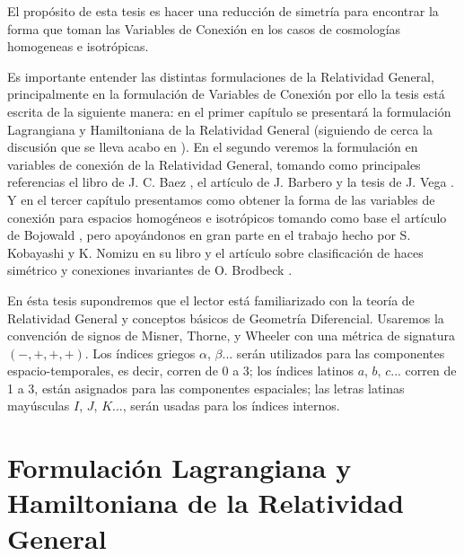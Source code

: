 \documentclass[11pt, letterpaper, spanish]{book}
\theoremstyle{definition}
\theoremstyle{plain}
\theoremstyle{remark}
\theoremstyle{break}
\begin{document}
El prop\'{o}sito de esta tesis es hacer una reducci\'{o}n de simetr\'{i}a para encontrar la forma que toman las Variables de Conexi\'{o}n en los casos de cosmolog\'{i}as homogeneas e isotr\'{o}picas.

Es importante entender las distintas formulaciones de la Relatividad General, principalmente en la formulaci\'{o}n de Variables de Conexi\'{o}n por ello la tesis est\'{a} escrita de la siguiente manera: en el primer cap\'{i}tulo se presentar\'{a} la formulaci\'{o}n Lagrangiana y Hamiltoniana de la Relatividad General (siguiendo de cerca la discusi\'{o}n que se lleva acabo en \cite{Poisson}). En el segundo veremos la formulaci\'{o}n en variables de conexi\'{o}n de la Relatividad General, tomando como principales referencias el libro de J. C. Baez \cite{Baez}, el art\'{i}culo de J. Barbero \cite{Barbero} y la tesis de J. Vega \cite{Vega}. Y en el tercer cap\'{i}tulo presentamos como obtener la forma de las variables de conexi\'{o}n para espacios homog\'{e}neos e isotr\'{o}picos tomando como base el art\'{i}culo de Bojowald \cite{Bojowald2005}, pero apoy\'{a}ndonos en gran parte en el trabajo hecho por S. Kobayashi y K. Nomizu en su libro \cite{Kobayashi} y el art\'{i}culo sobre clasificaci\'{o}n de haces sim\'{e}trico y conexiones invariantes de O. Brodbeck \cite{Brodbeck}.

En \'{e}sta tesis supondremos que el lector est\'{a} familiarizado con la teor\'{i}a de Relatividad General y conceptos b\'{a}sicos de Geometr\'{i}a Diferencial. Usaremos la convenci\'{o}n de signos de Misner, Thorne, y Wheeler con una m\'{e}trica de signatura $(-,+,+,+)$. Los \'{i}ndices griegos $\alpha$, $\beta...$ ser\'{a}n utilizados para las componentes espacio-temporales, es decir, corren de 0 a 3; los \'{i}ndices latinos $a$, $b$, $c...$ corren de 1 a 3, est\'{a}n asignados para las componentes espaciales; las letras latinas may\'{u}sculas $I$, $J$, $K$..., ser\'{a}n usadas para los \'{i}ndices internos.


\chapter{Formulaci\'{o}n Lagrangiana y Hamiltoniana de la Relatividad General}
\label{chp:RG}


\end{document}
